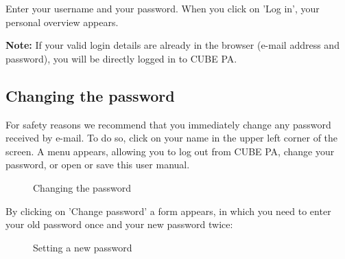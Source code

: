 Enter your username and your password. When you click on 'Log in', your personal overview appears.

\vspace{\baselineskip}

\textbf{Note:} If your valid login details are already in the browser (e-mail address and password), you will be directly logged in to CUBE PA.

\subsection{Changing the password}
\label{bkm:Ref434828103}

For safety reasons we recommend that you immediately change any password received by e-mail. To do so, click on your name in the upper left corner of the screen. A menu appears, allowing you to log out from CUBE PA, change your password, or open or save this user manual.

\begin{figure}[H]
\caption{Changing the password}
\end{figure}

By clicking on 'Change password' a form appears, in which you need to enter your old password once and your new password twice:

\begin{figure}[H]
\caption{Setting a new password}
\end{figure}

